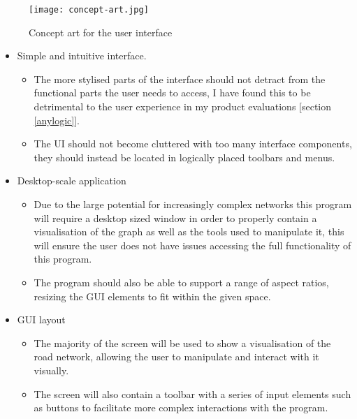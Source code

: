     \begin{figure}[ht]
        \centering
        \texttt{[image: concept-art.jpg]}
        \caption{Concept art for the user interface}
    \end{figure}

    \begin{itemize}
        \item Simple and intuitive interface.
        \begin{itemize}
            \item The more stylised parts of the interface should not detract from the functional parts the user needs to access, I have found this to be detrimental to the user experience in my product evaluations [section \ref{anylogic}].
            \item The UI should not become cluttered with too many interface components, they should instead be located in logically placed toolbars and menus.
        \end{itemize}
        \item Desktop-scale application
        \begin{itemize}
            \item Due to the large potential for increasingly complex networks this program will require a desktop sized window in order to properly contain a visualisation of the graph as well as the tools used to manipulate it, this will ensure the user does not have issues accessing the full functionality of this program.
            \item The program should also be able to support a range of aspect ratios, resizing the GUI elements to fit within the given space.
        \end{itemize}
        \item GUI layout
        \begin{itemize}
            \item The majority of the screen will be used to show a visualisation of the road network, allowing the user to manipulate and interact with it visually.
            \item The screen will also contain a toolbar with a series of input elements such as buttons to facilitate more complex interactions with the program.
        \end{itemize}
    \end{itemize}
